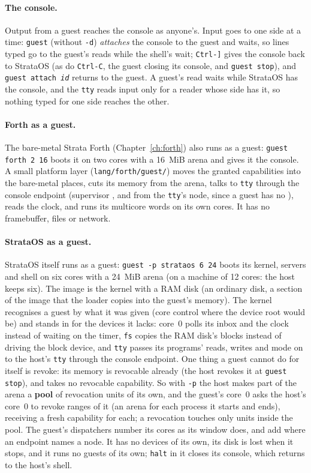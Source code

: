 \paragraph{The console.} Output from a guest reaches the console as anyone's. Input goes to one side at a
time: \texttt{guest} (without \texttt{-d}) \emph{attaches} the console to the guest and waits, so lines
typed go to the guest's reads while the shell's wait; \texttt{Ctrl-]} gives the console back to
StrataOS (as do \texttt{Ctrl-C}, the guest closing its console, and \texttt{guest stop}), and
\texttt{guest attach \emph{id}} returns to the guest. A guest's read waits while StrataOS has the
console, and the \texttt{tty} reads input only for a reader whose side has it, so nothing typed for
one side reaches the other.

\paragraph{Forth as a guest.} The bare-metal Strata Forth (Chapter~\ref{ch:forth}) also runs as a guest:
\texttt{guest forth 2 16} boots it on two cores with a 16~MiB arena and gives it the console. A small
platform layer (\texttt{lang/forth/guest/}) moves the granted capabilities into the bare-metal places,
cuts its memory from the arena, talks to \texttt{tty} through the console endpoint (supervisor
, and  from the \texttt{tty}'s node, since a guest has no ), reads
the clock, and runs its multicore words on its own cores. It has no framebuffer, files or network.

\paragraph{StrataOS as a guest.} StrataOS itself runs as a guest: \texttt{guest -p strataos 6 24} boots
its kernel, servers and shell on six cores with a 24~MiB arena (on a machine of 12 cores: the host keeps
six). The image is the kernel with a RAM disk (an ordinary disk, a section of the
image that the loader copies into the guest's memory). The kernel recognises a guest by what it was
given (core control where the device root would be) and stands in for the devices it lacks: core~0
polls its inbox and the clock instead of waiting on the timer, \texttt{fs} copies the RAM disk's
blocks instead of driving the block device, and \texttt{tty} passes its programs' reads, writes and
mode on to the host's \texttt{tty} through the console endpoint. One thing a guest cannot do for itself
is revoke: its memory is revocable already (the host revokes it at \texttt{guest stop}), and
 takes no revocable capability. So with \texttt{-p} the host makes part of the arena a
\textbf{pool} of revocation units of its own, and the guest's core~0 asks the host's core~0 to revoke
ranges of it (an arena for each process it starts and ends), receiving a fresh capability for each; a
revocation touches only units inside the pool. The guest's dispatchers number its cores as its window
does, and add  where an endpoint names a node. It has no devices of its own, its disk is
lost when it stops, and it runs no guests of its own; \texttt{halt} in it closes its console, which
returns to the host's shell.

